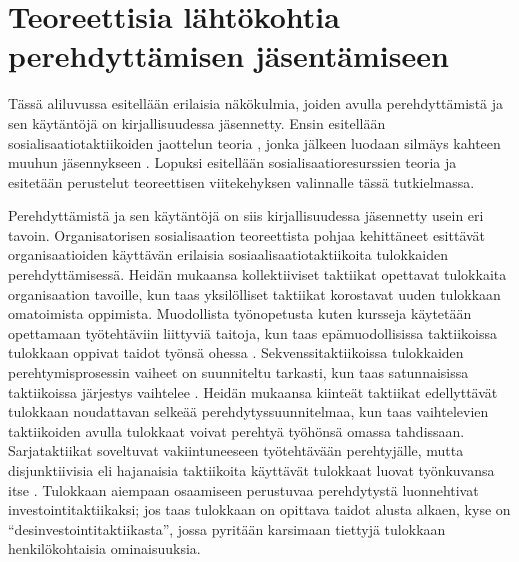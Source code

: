 \documentclass[utf8]{gradu3}
\begin{document}
\section{Teoreettisia lähtökohtia perehdyttämisen jäsentämiseen}
\label{luku-teoreettisia-lähestymistapoja-perehdyttämiseen}

Tässä aliluvussa esitellään erilaisia näkökulmia, joiden avulla perehdyttämistä ja sen käytäntöjä on kirjallisuudessa jäsennetty. Ensin esitellään sosialisaatiotaktiikoiden jaottelun teoria \parencite{van-maanen-schein-1979}, jonka jälkeen luodaan silmäys kahteen muuhun jäsennykseen \parencite{bauer-2010}. Lopuksi esitellään sosialisaatioresurssien teoria \parencite{saks-gruman-2012} ja esitetään perustelut teoreettisen viitekehyksen valinnalle tässä tutkielmassa.

Perehdyttämistä ja sen käytäntöjä on siis kirjallisuudessa jäsennetty usein eri tavoin. Organisatorisen sosialisaation teoreettista pohjaa kehittäneet \textcite{van-maanen-schein-1979} esittävät organisaatioiden käyttävän erilaisia sosiaalisaatiotaktiikoita tulokkaiden perehdyttämisessä. Heidän mukaansa kollektiiviset taktiikat opettavat tulokkaita organisaation tavoille, kun taas yksilölliset taktiikat korostavat uuden tulokkaan omatoimista oppimista. Muodollista työnopetusta kuten kursseja käytetään opettamaan työtehtäviin liittyviä taitoja, kun taas epämuodollisissa taktiikoissa tulokkaan oppivat taidot työnsä ohessa \parencite{van-maanen-schein-1979}. Sekvenssitaktiikoissa tulokkaiden perehtymisprosessin vaiheet on suunniteltu tarkasti, kun taas satunnaisissa taktiikoissa järjestys vaihtelee \parencite{van-maanen-schein-1979}. Heidän mukaansa kiinteät taktiikat edellyttävät tulokkaan noudattavan selkeää perehdytyssuunnitelmaa, kun taas vaihtelevien taktiikoiden avulla tulokkaat voivat perehtyä työhönsä omassa tahdissaan. Sarjataktiikat soveltuvat vakiintuneeseen työtehtävään perehtyjälle, mutta disjunktiivisia eli hajanaisia taktiikoita käyttävät tulokkaat luovat työnkuvansa itse \parencite{van-maanen-schein-1979}. Tulokkaan aiempaan osaamiseen perustuvaa perehdytystä \textcite{van-maanen-schein-1979} luonnehtivat investointitaktiikaksi; jos taas tulokkaan on opittava taidot alusta alkaen, kyse on ``desinvestointitaktiikasta'', jossa pyritään karsimaan tiettyjä tulokkaan henkilökohtaisia ominaisuuksia.
\end{document}
